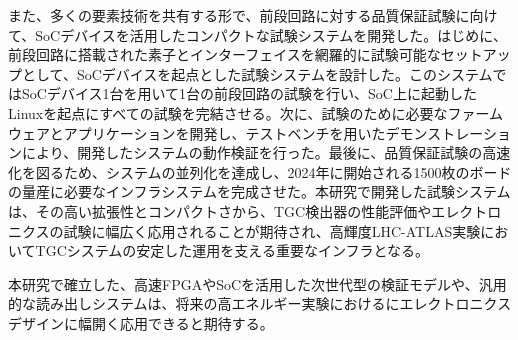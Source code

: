 また、多くの要素技術を共有する形で、前段回路に対する品質保証試験に向けて、SoCデバイスを活用したコンパクトな試験システムを開発した。はじめに、前段回路に搭載された素子とインターフェイスを網羅的に試験可能なセットアップとして、SoCデバイスを起点とした試験システムを設計した。このシステムではSoCデバイス1台を用いて1台の前段回路の試験を行い、SoC上に起動したLinuxを起点にすべての試験を完結させる。次に、試験のために必要なファームウェアとアプリケーションを開発し、テストベンチを用いたデモンストレーションにより、開発したシステムの動作検証を行った。最後に、品質保証試験の高速化を図るため、システムの並列化を達成し、2024年に開始される1500枚のボードの量産に必要なインフラシステムを完成させた。本研究で開発した試験システムは、その高い拡張性とコンパクトさから、TGC検出器の性能評価やエレクトロニクスの試験に幅広く応用されることが期待され、高輝度LHC-ATLAS実験においてTGCシステムの安定した運用を支える重要なインフラとなる。

本研究で確立した、高速FPGAやSoCを活用した次世代型の検証モデルや、汎用的な読み出しシステムは、将来の高エネルギー実験におけるにエレクトロニクスデザインに幅開く応用できると期待する。

